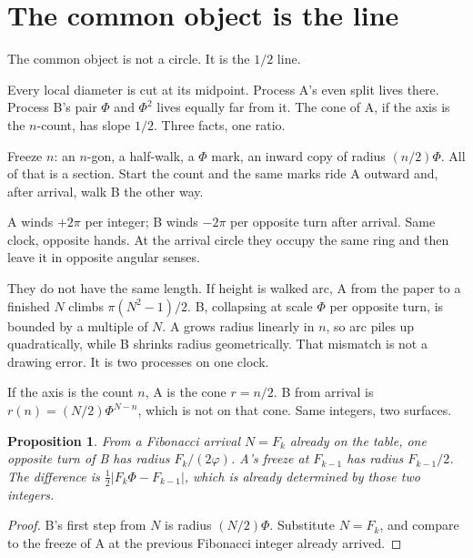 \documentclass[10pt,a4paper]{article}
\theoremstyle{plain}
\newtheorem{proposition}{Proposition}
\theoremstyle{definition}
\begin{document}
\newpage
\tableofcontents
\newpage

\section{The common object is the line}

The common object is not a circle.
It is the $1/2$ line.

Every local diameter is cut at its midpoint.
Process A's even split lives there.
Process B's pair $\Phi$ and $\Phi^{2}$ lives equally far from it.
The cone of A, if the axis is the $n$-count, has slope $1/2$.
Three facts, one ratio.

Freeze $n$: an $n$-gon, a half-walk, a $\Phi$ mark, an inward copy of radius $(n/2)\Phi$.
All of that is a section.
Start the count and the same marks ride A outward and, after arrival, walk B the other way.

A winds $+2\pi$ per integer; B winds $-2\pi$ per opposite turn after arrival.
Same clock, opposite hands.
At the arrival circle they occupy the same ring and then leave it in opposite angular senses.

They do not have the same length.
If height is walked arc, A from the paper to a finished $N$ climbs $\pi(N^{2}-1)/2$.
B, collapsing at scale $\Phi$ per opposite turn, is bounded by a multiple of $N$.
A grows radius linearly in $n$, so arc piles up quadratically, while B shrinks radius geometrically.
That mismatch is not a drawing error.
It is two processes on one clock.

If the axis is the count $n$, A is the cone $r=n/2$.
B from arrival is $r(n)=(N/2)\Phi^{N-n}$, which is not on that cone.
Same integers, two surfaces.

\begin{proposition}
From a Fibonacci arrival $N=F_k$ already on the table, one opposite turn of B has radius $F_k/(2\varphi)$.
A's freeze at $F_{k-1}$ has radius $F_{k-1}/2$.
The difference is $\tfrac12|F_k\Phi-F_{k-1}|$, which is already determined by those two integers.
\end{proposition}

\begin{proof}
B's first step from $N$ is radius $(N/2)\Phi$.
Substitute $N=F_k$, and compare to the freeze of A at the previous Fibonacci integer already arrived.
\end{proof}
\end{document}
